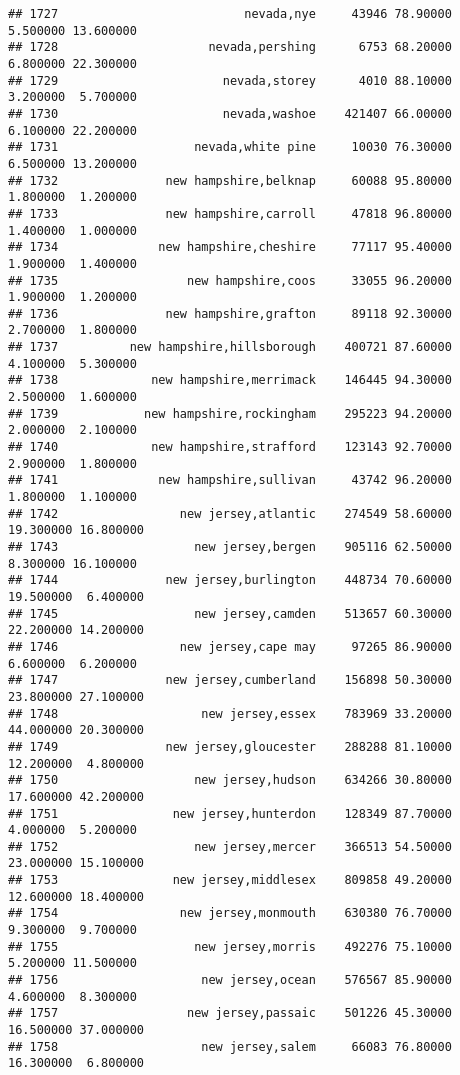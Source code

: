 \documentclass[
]{article}
\begin{document}
\begin{verbatim}
## 1727                          nevada,nye     43946 78.90000  5.500000 13.600000
## 1728                     nevada,pershing      6753 68.20000  6.800000 22.300000
## 1729                       nevada,storey      4010 88.10000  3.200000  5.700000
## 1730                       nevada,washoe    421407 66.00000  6.100000 22.200000
## 1731                   nevada,white pine     10030 76.30000  6.500000 13.200000
## 1732               new hampshire,belknap     60088 95.80000  1.800000  1.200000
## 1733               new hampshire,carroll     47818 96.80000  1.400000  1.000000
## 1734              new hampshire,cheshire     77117 95.40000  1.900000  1.400000
## 1735                  new hampshire,coos     33055 96.20000  1.900000  1.200000
## 1736               new hampshire,grafton     89118 92.30000  2.700000  1.800000
## 1737          new hampshire,hillsborough    400721 87.60000  4.100000  5.300000
## 1738             new hampshire,merrimack    146445 94.30000  2.500000  1.600000
## 1739            new hampshire,rockingham    295223 94.20000  2.000000  2.100000
## 1740             new hampshire,strafford    123143 92.70000  2.900000  1.800000
## 1741              new hampshire,sullivan     43742 96.20000  1.800000  1.100000
## 1742                 new jersey,atlantic    274549 58.60000 19.300000 16.800000
## 1743                   new jersey,bergen    905116 62.50000  8.300000 16.100000
## 1744               new jersey,burlington    448734 70.60000 19.500000  6.400000
## 1745                   new jersey,camden    513657 60.30000 22.200000 14.200000
## 1746                 new jersey,cape may     97265 86.90000  6.600000  6.200000
## 1747               new jersey,cumberland    156898 50.30000 23.800000 27.100000
## 1748                    new jersey,essex    783969 33.20000 44.000000 20.300000
## 1749               new jersey,gloucester    288288 81.10000 12.200000  4.800000
## 1750                   new jersey,hudson    634266 30.80000 17.600000 42.200000
## 1751                new jersey,hunterdon    128349 87.70000  4.000000  5.200000
## 1752                   new jersey,mercer    366513 54.50000 23.000000 15.100000
## 1753                new jersey,middlesex    809858 49.20000 12.600000 18.400000
## 1754                 new jersey,monmouth    630380 76.70000  9.300000  9.700000
## 1755                   new jersey,morris    492276 75.10000  5.200000 11.500000
## 1756                    new jersey,ocean    576567 85.90000  4.600000  8.300000
## 1757                  new jersey,passaic    501226 45.30000 16.500000 37.000000
## 1758                    new jersey,salem     66083 76.80000 16.300000  6.800000

\end{verbatim}
\end{document}
